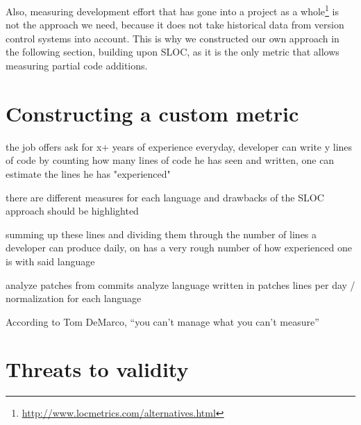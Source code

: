 Also, measuring development effort that has gone into a project as a
whole\footnote{\url{http://www.locmetrics.com/alternatives.html}}
is not the approach we need, because it does not take historical data from
version control systems  into account. This is why we constructed our own
approach in the following section, building upon SLOC,
as it is the only metric that allows measuring partial code additions.

\section{Constructing a custom metric}
the job offers ask for x+ years of experience
everyday, developer can write y lines of code
by counting how many lines of code he has seen and written, one can estimate
the lines he has "experienced"

there are different measures for each language and drawbacks of the SLOC approach
should be highlighted

summing up these lines and dividing them through the number of lines a developer can produce daily, on has a very rough number of how experienced one is with said language

analyze patches from commits
analyze language written in patches
lines per day / normalization for each language

According to Tom
DeMarco, “you can’t manage what you
can’t measure” \cite{tdm:1986}

\section{Threats to validity}
